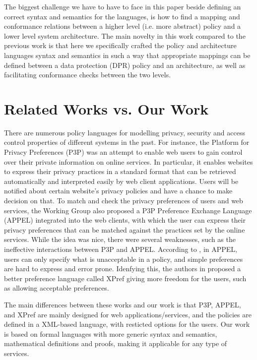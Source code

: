 \documentclass[a4paper]{article}
\begin{document}
The biggest challenge we have to have to face in this paper beside defining an correct syntax and semantics for the languages, is how to find a mapping and conformance relations between a higher level (i.e. more abstract) policy and a lower level system architecture. The main novelty in this work compared to the previous work is that here we specifically crafted the policy and architecture languages syntax and semantics in such a way that appropriate mappings can be defined between a data protection (DPR) policy and an architecture, as well as facilitating conformance checks between the two levels. 

\section{Related Works vs. Our Work}
\label{sec:related}


There are numerous policy languages for modelling privacy, security and access control properties of different systems in the past. For instance, the Platform for Privacy Preferences (P3P) \cite{P3P} was an attempt to enable web users 
to gain control over their private information on online services. In particular, it enables websites 
to express their privacy practices in a standard format that can be retrieved automatically and interpreted 
easily by web client applications. Users will be notified about certain website's privacy policies and have a 
chance to make decision on that. To match and check the privacy preferences of users and web services, the Working 
Group also proposed a P3P Preference Exchange Language (APPEL) \cite{APPEL} integrated into the web clients, with 
which the user can express their privacy preferences that can be matched against the practices set by the online 
services. While the idea was nice, there were several weaknesses, such as the ineffective interactions between P3P 
and APPEL. According to \cite{XPref}, in APPEL, users can only specify what is unacceptable in a policy, and 
simple preferences are hard to express and error prone. Idenfying this, the authors in \cite{XPref} proposed a 
better preference language called XPref giving more freedom for the users, such as allowing acceptable preferences. 

The main differences between these works and our work is that P3P, APPEL, and XPref are mainly designed for web 
applications/services, and the policies are defined in a XML-based language, with resticted options for the 
users. Our work is based on formal languages with more generic syntax and semantics, mathematical definitions and 
proofs, making it applicable for any type of services.  
\end{document}
